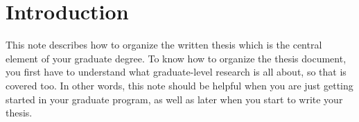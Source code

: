 %
%
%
%
\chapter{Introduction}\label{chap:introduction}
This note describes how to organize the written thesis which is the central element of your graduate degree. To know how to organize the thesis document, you first have to understand what graduate-level research is all about, so that is covered too. In other words, this note should be helpful when you are just getting started in your graduate program, as well as later when you start to write your thesis. 